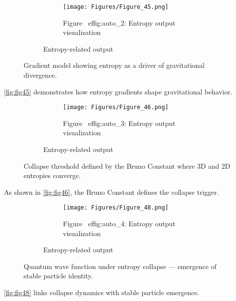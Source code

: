 \documentclass[12pt]{article}
\begin{document}
\begin{figure}[H]
    \centering
    \begin{figure}[H]
\centering
\begin{figure}[H]
\centering
\texttt{[image: Figures/Figure\_45.png]}
\caption{Figure~
ef{fig:auto_2}: Entropy output visualization}
\label{fig:auto_2}
\end{figure}
\caption{Entropy-related output}
\label{fig:Figures_Figure_45_png}
\end{figure}

    \caption{Gradient model showing entropy as a driver of gravitational divergence.}
    \label{fig:fig45}
\end{figure}
\autoref{fig:fig45} demonstrates how entropy gradients shape gravitational behavior.

\begin{figure}[H]
    \centering
    \begin{figure}[H]
\centering
\begin{figure}[H]
\centering
\texttt{[image: Figures/Figure\_46.png]}
\caption{Figure~
ef{fig:auto_3}: Entropy output visualization}
\label{fig:auto_3}
\end{figure}
\caption{Entropy-related output}
\label{fig:Figures_Figure_46_png}
\end{figure}

    \caption{Collapse threshold defined by the Bruno Constant where 3D and 2D entropies converge.}
    \label{fig:fig46}
\end{figure}
As shown in \autoref{fig:fig46}, the Bruno Constant defines the collapse trigger.

\begin{figure}[H]
    \centering
    \begin{figure}[H]
\centering
\begin{figure}[H]
\centering
\texttt{[image: Figures/Figure\_48.png]}
\caption{Figure~
ef{fig:auto_4}: Entropy output visualization}
\label{fig:auto_4}
\end{figure}
\caption{Entropy-related output}
\label{fig:Figures_Figure_48_png}
\end{figure}

    \caption{Quantum wave function under entropy collapse — emergence of stable particle identity.}
    \label{fig:fig48}
\end{figure}
\autoref{fig:fig48} links collapse dynamics with stable particle emergence.
\end{document}
